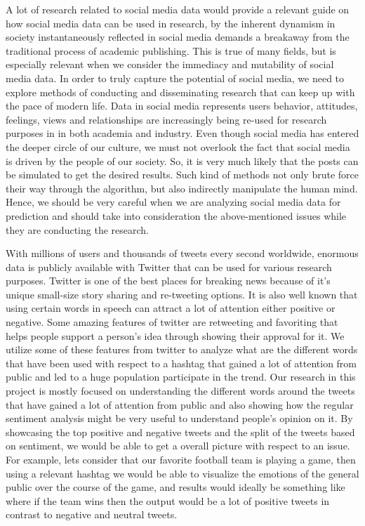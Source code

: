A lot of research related to social media data would provide a relevant guide on how 
social media data can be used in research, by the inherent dynamism in society 
instantaneously reflected in social media demands a breakaway from the traditional 
process of academic publishing. This is true of many fields, but is 
especially relevant when we consider the immediacy and mutability of 
social media data. In order to truly capture the potential of social 
media, we need to explore methods of conducting and disseminating 
research that can keep up with the pace of modern life. Data in social media 
represents users behavior, attitudes, feelings, views and relationships are
increasingly being re-used for research purposes in in both academia and industry. 
Even though social media has entered the deeper circle of our culture, we must 
not overlook the fact that social media is driven by the people of our society. 
So, it is very much likely that the posts can be simulated to get the desired 
results. Such kind of methods not only brute force their way through the 
algorithm, but also indirectly manipulate the human mind. Hence, we
should be very careful when we are analyzing social media data for prediction 
and should take into consideration the above-mentioned issues while they are 
conducting the research.

With millions of users and thousands of tweets every second worldwide, enormous 
data is publicly available with Twitter that can be used for 
various research purposes. Twitter is one of the best places for breaking news 
because of it’s unique small-size story sharing and re-tweeting options. 
It is also well known that using certain words in speech can attract a lot of attention 
either positive or negative. Some amazing features of twitter are retweeting and 
favoriting that helps people support a person’s idea through showing their 
approval for it. We utilize some of these features from twitter to analyze what are the 
different words that have been used with respect to a hashtag that gained a lot of 
attention from public and led to a huge population participate in the trend. 
Our research in this project is mostly focused on understanding the different 
words around the tweets that have gained a lot of attention from public and also 
showing how the regular sentiment analysis might be very useful to understand 
people’s opinion on it. By showcasing the top positive and negative tweets and 
the split of the tweets based on sentiment, we would be able to get a overall 
picture with respect to an issue. For example, lets consider that our favorite 
football team is playing a game, then using a relevant hashtag we would be able 
to visualize the emotions of the general public over the course of the game, and 
results would ideally be something like where if the team wins then the output 
would be a lot of positive tweets in contrast to negative and neutral tweets. 


